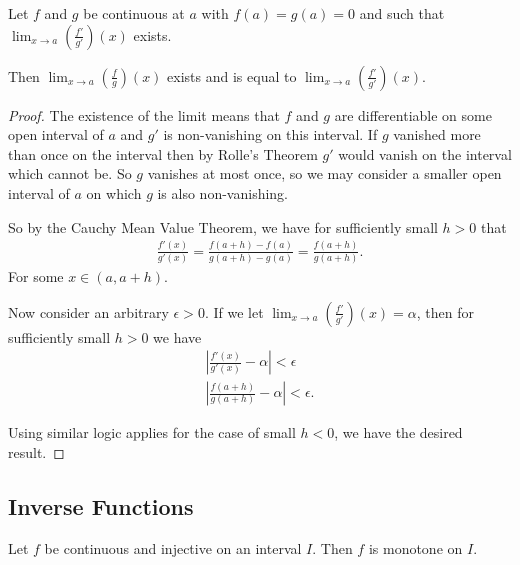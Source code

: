 \documentclass[]{article}
\begin{document}
\begin{thm} 
		Let $f$ and $g$ be continuous at $a$ with $f(a) = g(a) = 0$ and such that $\lim_{x \to a} (\frac{f'}{g'})(x)$ exists.

		Then $\lim_{x\to a} (\frac{f}{g})(x)$ exists and is equal to $\lim_{x \to a} (\frac{f'}{g'})(x)$.
\end{thm}

\begin{proof}
		The existence of the limit means that $f$ and $g$ are differentiable on some open interval of $a$ and $g'$ is non-vanishing on this interval. If $g$ vanished more than once on the interval then by Rolle's Theorem $g'$ would vanish on the interval which cannot be. So $g$ vanishes at most once, so we may consider a smaller open interval of $a$ on which $g$ is also non-vanishing.

		So by the Cauchy Mean Value Theorem, we have for sufficiently small $h > 0$ that
		\begin{align*}
				\frac{f'(x)}{g'(x)} = \frac{f(a+h)-f(a)}{g(a+h)-g(a)} = \frac{f(a+h)}{g(a+h)}.
		\end{align*}
		For some $x \in (a, a+h)$.
		
		Now consider an arbitrary $\epsilon > 0$. If we let $\lim_{x \to a} (\frac{f'}{g'})(x) = \alpha$, then for sufficiently small $h > 0 $ we have
		\begin{align*}
				|\frac{f'(x)}{g'(x)} - \alpha| < \epsilon \\
				|\frac{f(a+h)}{g(a+h)} - \alpha| < \epsilon.
		\end{align*}

		Using similar logic applies for the case of small $h < 0$, we have the desired result.
\end{proof}

\subsection{Inverse Functions}

\begin{thm}
		Let $f$ be continuous and injective on an interval $I$. Then $f$ is monotone on $I$.
\end{thm}

\begin{figure}[ht]
\centering
{}
\caption{}
\label{fig:continuous-injection-monotone}
\end{figure}
\end{document}
